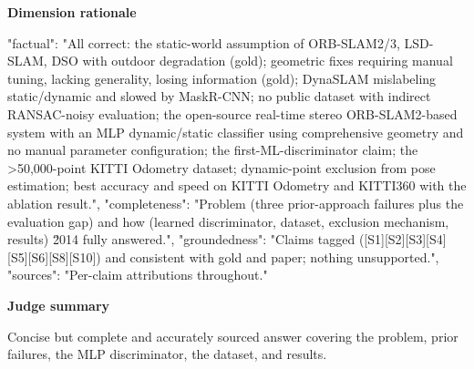 \documentclass[10pt]{article}
\begin{document}
\textbf{Dimension rationale}
\begin{EvidenceText}
{
  "factual": "All correct: the static-world assumption of ORB-SLAM2/3, LSD-SLAM, DSO with outdoor degradation (gold); geometric fixes requiring manual tuning, lacking generality, losing information (gold); DynaSLAM mislabeling static/dynamic and slowed by MaskR-CNN; no public dataset with indirect RANSAC-noisy evaluation; the open-source real-time stereo ORB-SLAM2-based system with an MLP dynamic/static classifier using comprehensive geometry and no manual parameter configuration; the first-ML-discriminator claim; the >50,000-point KITTI Odometry dataset; dynamic-point exclusion from pose estimation; best accuracy and speed on KITTI Odometry and KITTI360 with the ablation result.",
  "completeness": "Problem (three prior-approach failures plus the evaluation gap) and how (learned discriminator, dataset, exclusion mechanism, results) \u2014 fully answered.",
  "groundedness": "Claims tagged ([S1][S2][S3][S4][S5][S6][S8][S10]) and consistent with gold and paper; nothing unsupported.",
  "sources": "Per-claim attributions throughout."
}
\end{EvidenceText}

\textbf{Judge summary}
\begin{EvidenceText}
Concise but complete and accurately sourced answer covering the problem, prior failures, the MLP discriminator, the dataset, and results.
\end{EvidenceText}
\end{document}
